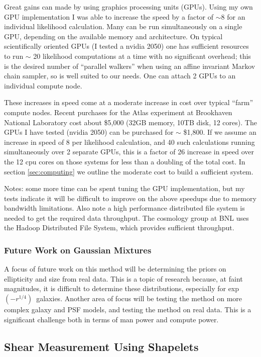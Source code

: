 \documentclass[12pt]{article}
\newcommand{\devprof}{exp$(-r^{1/4})$}
\begin{document}
Great gains can made by using graphics processing units (GPUs).  Using my own
GPU implementation I was able to increase the speed by a factor of $\sim 8$ for
an individual likelihood calculation. Many can be run simultaneously on a
single GPU, depending on the available memory and architecture.  On typical
scientifically oriented GPUs (I tested a nvidia 2050) one has sufficient
resources to run $\sim$ 20 likelihood computations at a time with no
significant overhead; this is the desired number of ``parallel walkers'' when
using an affine invariant Markov chain sampler, so is well suited to our needs.
One can attach 2 GPUs to an individual compute node.

These increases in speed come at a moderate increase in cost over typical
``farm'' compute nodes.  Recent purchases for the Atlas experiment at
Brookhaven National Laboratory cost about \$5,000 (32GB memory, 10TB disk, 12
cores).  The GPUs I have tested (nvidia 2050) can be purchased for $\sim$
\$1,800.  If we assume an increase in speed of 8 per likelihood calculation,
and 40 such calculations running simultaneously over 2 separate GPUs, this is a
factor of 26 increase in speed over the 12 cpu cores on those systems for less
than a doubling of the total cost.  In section \ref{sec:computing} we outline
the moderate cost to build a sufficient system.

Notes: some more time can be spent tuning the GPU implementation, but my tests
indicate it will be difficult to improve on the above speedups due to memory
bandwidth limitations.  Also note a high performance distributed file system is
needed to get the required data throughput.  The cosmology group at BNL uses
the Hadoop Distributed File System, which provides sufficient throughput.

\subsubsection{Future Work on Gaussian Mixtures}

A focus of future work on this method will be determining the priors on
ellipticity and size from real data.  This is a topic of research because, at
faint magnitudes, it is difficult to determine these distributions, especially
for \devprof\ galaxies\cite{Miller12}.  Another area of focus will be testing
the method on more complex galaxy and PSF models, and testing the method on
real data.  This is a significant challenge both in terms of man power and
compute power. 


\subsection{Shear Measurement Using Shapelets}
\label{sec:shapelets}
\end{document}
